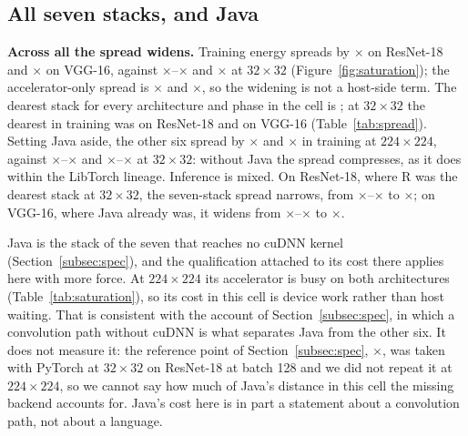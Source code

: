 \subsection{All seven stacks, and Java}
\label{app:sat-all}

\textbf{Across all \vSatEcosystems{} the spread widens.} Training energy spreads
by \vSatSpreadTrainResnet$\times$ on ResNet-18 and \vSatSpreadTrainVgg$\times$
on VGG-16, against
\vSatRefSpreadTrainResnetMin$\times$--\vSatRefSpreadTrainResnetMax$\times$ and
\vSatRefSpreadTrainVggMax$\times$ at $32\times32$ (Figure~\ref{fig:saturation}); the accelerator-only spread
is \vSatSpreadGpuTrainResnet$\times$ and \vSatSpreadGpuTrainVgg$\times$, so the
widening is not a host-side term. The dearest stack for every architecture and
phase in the cell is \vSatWorstTrainResnet{}; at $32\times32$ the dearest in training was
\vSatRefWorstTrainResnet{} on ResNet-18 and \vSatRefWorstTrainVgg{} on VGG-16
(Table~\ref{tab:spread}). Setting Java aside, the other six spread by
\vSatNoJavaSpreadTrainResnet$\times$ and \vSatNoJavaSpreadTrainVgg$\times$ in
training at $224\times224$, against
\vSatNoJavaRefSpreadTrainResnetMin$\times$--\vSatNoJavaRefSpreadTrainResnetMax$\times$
and
\vSatNoJavaRefSpreadTrainVggMin$\times$--\vSatNoJavaRefSpreadTrainVggMax$\times$
at $32\times32$: without Java the spread compresses, as it does within the
LibTorch lineage. Inference is mixed. On ResNet-18, where R was the dearest
stack at $32\times32$, the seven-stack spread narrows, from
\vSatRefSpreadInferResnetMin$\times$--\vSatRefSpreadInferResnetMax$\times$ to
\vSatSpreadInferResnet$\times$; on VGG-16, where Java already was, it widens from
\vSatRefSpreadInferVggMin$\times$--\vSatRefSpreadInferVggMax$\times$ to
\vSatSpreadInferVgg$\times$.

Java is the stack of the seven that reaches no cuDNN kernel
(Section~\ref{subsec:spec}), and the qualification attached to its cost there
applies here with more force. At $224\times224$ its accelerator is busy on both
architectures (Table~\ref{tab:saturation}), so its cost in this cell is device
work rather than host waiting. That is consistent with the account of
Section~\ref{subsec:spec}, in which a convolution path without cuDNN is what
separates Java from the other six. It does not measure it: the reference point
of Section~\ref{subsec:spec}, \vCudnnOffEnergyRatio$\times$, was taken with
PyTorch at $32\times32$ on ResNet-18 at batch 128 and we did not repeat it at
$224\times224$, so we cannot say how much of Java's distance in this cell the
missing backend accounts for. Java's cost here is in part a statement about a
convolution path, not about a language.

